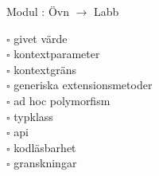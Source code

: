
    Modul : Övn  $\rightarrow$ Labb 
    \begin{multicols}{3}\SlideFontTiny
    $\square$ givet värde \\
$\square$ kontextparameter \\
$\square$ kontextgräns \\
$\square$ generiska extensionsmetoder \\
$\square$ ad hoc polymorfism \\
$\square$ typklass \\
$\square$ api \\
$\square$ kodläsbarhet \\
$\square$ granskningar \\
    \end{multicols}
    